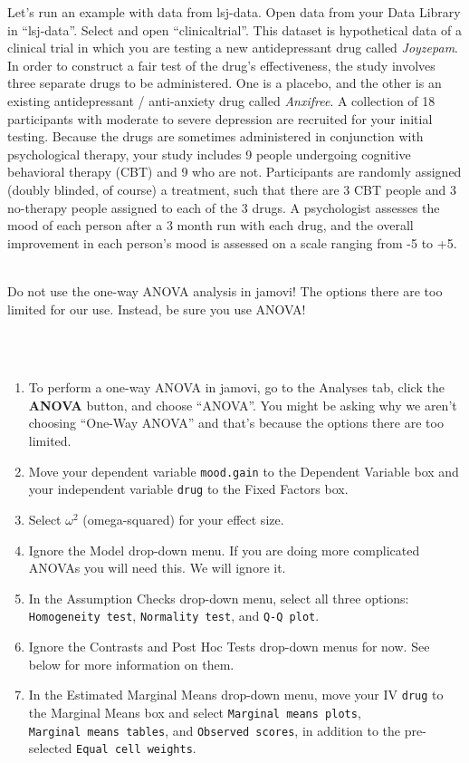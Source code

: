 \documentclass[
]{book}
\newenvironment{warning}
    {
    \hline\\
    }
    { 
    \\\\\hline
    }
\begin{document}
Let's run an example with data from lsj-data. Open data from your Data Library in ``lsj-data''. Select and open ``clinicaltrial''. This dataset is hypothetical data of a clinical trial in which you are testing a new antidepressant drug called \emph{Joyzepam}. In order to construct a fair test of the drug's effectiveness, the study involves three separate drugs to be administered. One is a placebo, and the other is an existing antidepressant / anti-anxiety drug called \emph{Anxifree}. A collection of 18 participants with moderate to severe depression are recruited for your initial testing. Because the drugs are sometimes administered in conjunction with psychological therapy, your study includes 9 people undergoing cognitive behavioral therapy (CBT) and 9 who are not. Participants are randomly assigned (doubly blinded, of course) a treatment, such that there are 3 CBT people and 3 no-therapy people assigned to each of the 3 drugs. A psychologist assesses the mood of each person after a 3 month run with each drug, and the overall improvement in each person's mood is assessed on a scale ranging from -5 to +5.

\begin{warning}
Do not use the one-way ANOVA analysis in jamovi! The options there are
too limited for our use. Instead, be sure you use ANOVA!
\end{warning}

\begin{enumerate}
\def\labelenumi{\arabic{enumi}.}
\item
  To perform a one-way ANOVA in jamovi, go to the Analyses tab, click the \textbf{ANOVA} button, and choose ``ANOVA''. You might be asking why we aren't choosing ``One-Way ANOVA'' and that's because the options there are too limited.
\item
  Move your dependent variable \texttt{mood.gain} to the Dependent Variable box and your independent variable \texttt{drug} to the Fixed Factors box.
\item
  Select \(\omega^2\) (omega-squared) for your effect size.
\item
  Ignore the Model drop-down menu. If you are doing more complicated ANOVAs you will need this. We will ignore it.
\item
  In the Assumption Checks drop-down menu, select all three options: \texttt{Homogeneity\ test}, \texttt{Normality\ test}, and \texttt{Q-Q\ plot}.
\item
  Ignore the Contrasts and Post Hoc Tests drop-down menus for now. See below for more information on them.
\item
  In the Estimated Marginal Means drop-down menu, move your IV \texttt{drug} to the Marginal Means box and select \texttt{Marginal\ means\ plots}, \texttt{Marginal\ means\ tables}, and \texttt{Observed\ scores}, in addition to the pre-selected \texttt{Equal\ cell\ weights}.
\end{enumerate}
\end{document}
